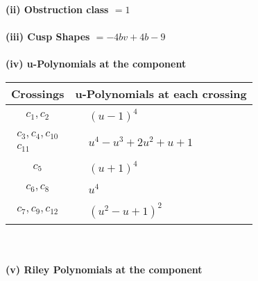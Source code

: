\documentclass[1p]{elsarticle_modified}
\theoremstyle{definition}
\begin{document}
\flushleft \textbf{(ii) Obstruction class $= 1$}\\~\\
\flushleft \textbf{(iii) Cusp Shapes $= -4 b v+4 b-9$}\\~\\
\newpage\renewcommand{\arraystretch}{1}
\flushleft \textbf{(iv) u-Polynomials at the component}\newline \\
\begin{tabular}{m{50pt}|m{274pt}}
Crossings & \hspace{64pt}u-Polynomials at each crossing \\
\hline $$\begin{aligned}c_{1},c_{2}\end{aligned}$$&$\begin{aligned}
&(u-1)^4
\end{aligned}$\\
\hline $$\begin{aligned}c_{3},c_{4},c_{10}\\c_{11}\end{aligned}$$&$\begin{aligned}
&u^4- u^3+2 u^2+u+1
\end{aligned}$\\
\hline $$\begin{aligned}c_{5}\end{aligned}$$&$\begin{aligned}
&(u+1)^4
\end{aligned}$\\
\hline $$\begin{aligned}c_{6},c_{8}\end{aligned}$$&$\begin{aligned}
&u^4
\end{aligned}$\\
\hline $$\begin{aligned}c_{7},c_{9},c_{12}\end{aligned}$$&$\begin{aligned}
&(u^2- u+1)^2
\end{aligned}$\\
\hline
\end{tabular}\\~\\
\newpage\renewcommand{\arraystretch}{1}
\flushleft \textbf{(v) Riley Polynomials at the component}\newline \\
\end{document}
